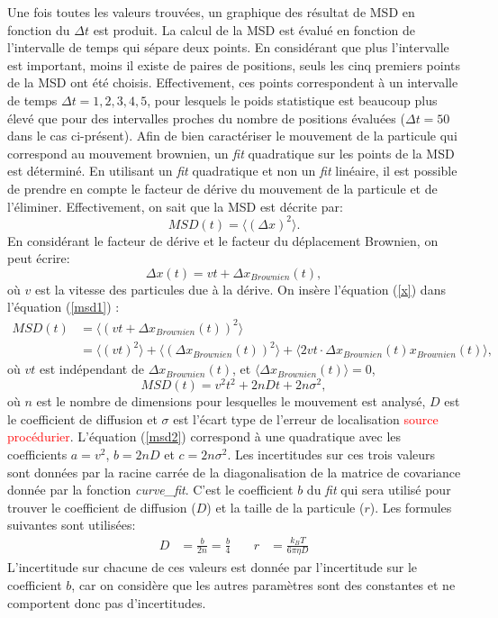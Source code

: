 \documentclass[11pt,letterpaper]{article}
\begin{document}
Une fois toutes les valeurs trouvées, un graphique des résultat de MSD en fonction du $\Delta t$ est produit. La calcul de la MSD est évalué en fonction de l'intervalle de temps
qui sépare deux points. En considérant que plus l'intervalle est important, moins il existe de paires de positions, seuls les cinq premiers points de
la MSD ont été choisis. Effectivement, ces points correspondent à un intervalle de temps $\Delta t=1,2,3,4,5$, pour lesquels le poids statistique est beaucoup plus élevé
que pour des intervalles proches du nombre de positions évaluées ($\Delta t=50$ dans le cas ci-présent).
Afin de bien caractériser le mouvement de la particule
qui correspond au mouvement brownien, un \textit{fit} quadratique sur les points de la MSD est déterminé. 
En utilisant un \textit{fit} quadratique et non un \textit{fit} linéaire,
il est possible de prendre en compte le facteur de dérive du mouvement de la particule et de l'éliminer. Effectivement, on sait que la MSD est décrite par:
\begin{equation}\label{msd1}
  MSD(t)=\langle\left(\Delta x \right)^2\rangle.
\end{equation} 
En considérant le facteur de dérive et le facteur du déplacement Brownien, on peut écrire:
\begin{equation}\label{x}
  \Delta x (t)=vt+\Delta x_{Brownien}(t),
\end{equation} 
où $v$ est la vitesse des particules due à la dérive. On insère l'équation (\ref{x}) dans l'équation (\ref{msd1}) :
\begin{align*}
  MSD(t)&=\langle\left(vt+\Delta x_{Brownien}(t) \right)^2\rangle\\
  &=\langle\left(vt\right)^2\rangle+\langle\left(\Delta x_{Brownien}(t)\right)^2\rangle+\langle2vt\cdot \Delta x_{Brownien}(t)x_{Brownien}(t)\rangle,
\end{align*}
où $vt$ est indépendant de $\Delta x_{Brownien}(t)$, et $\langle\Delta x_{Brownien}(t)\rangle=0$,
\begin{equation}\label{msd2}
  MSD(t)=v^2t^2+2nDt+2n\sigma^2,
\end{equation}
où $n$ est le nombre de dimensions pour lesquelles le mouvement est analysé, $D$ est le coefficient de diffusion et $\sigma$ est l'écart type
de l'erreur de localisation \textcolor{red}{source procédurier}. L'équation (\ref{msd2}) correspond à une quadratique avec
les coefficients $a=v^2$, $b=2nD$ et $c=2n\sigma^2$. Les incertitudes sur ces trois valeurs sont données par la racine carrée 
de la diagonalisation de la matrice de covariance donnée par la fonction \textit{curve\_fit}. 
C'est le coefficient $b$ du \textit{fit} qui sera utilisé pour trouver le coefficient de diffusion ($D$) et la taille de la particule ($r$). Les formules suivantes sont utilisées: 
\begin{align*}
  D &= \frac{b}{2n}=\frac{b}{4} \quad & r &= \frac{k_B T}{6 \pi \eta D}
\end{align*}
L'incertitude sur chacune de ces valeurs est donnée par l'incertitude sur le coefficient $b$, car on considère que les autres paramètres sont des constantes
et ne comportent donc pas d'incertitudes. 
\end{document}
